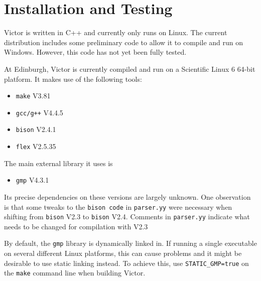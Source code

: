 \documentclass[12pt,fleqn]{article}
\begin{document}
\section{Installation and Testing}

Victor is written in C++ and currently only runs on Linux.  The
current distribution includes some preliminary code to allow it to
compile and run on Windows.  However, this code has not yet been fully
tested.

At Edinburgh, Victor is currently compiled and run on a Scientific Linux 6
64-bit platform.  It makes use of the following tools:
\begin{itemize}
\item \texttt{make} V3.81
\item \texttt{gcc/g++} V4.4.5
\item \texttt{bison}  V2.4.1
\item \texttt{flex} V2.5.35
\end{itemize}
The main external library it uses is
\begin{itemize}
\item \texttt{gmp} V4.3.1
\end{itemize}
Its precise dependencies on these versions are largely unknown. 
%
One observation is that some tweaks to the \texttt{bison code} in
\texttt{parser.yy} were necessary when shifting from \texttt{bison}
V2.3 to \texttt{bison} V2.4.  Comments in \texttt{parser.yy} indicate
what needs to be changed for compilation with V2.3

By default, the \texttt{gmp} library is dynamically linked in.  If
running a single executable on several different Linux platforms, this
can cause problems and it might be desirable to use static linking
instead.  To achieve this, use \texttt{STATIC\_GMP=true} on the
\texttt{make} command line when building Victor.
\end{document}
